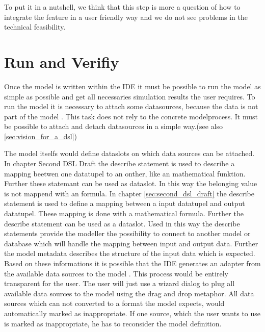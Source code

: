 To put it in a nutshell, we think that this step is more a question of how to integrate the feature in a user friendly way and we do not see problems in the technical feasibility.

\section{Run and Verifiy}
Once the model is written within the IDE it must be possible to run the model as simple as possible and get all necessaries simulation results the user requires. To run the model it is necessary to attach some datasources, because the data is not part of the model \autocite{dsl:muetzelfeldt}. This task does not rely to the concrete modelprocess. It must be possible to attach and detach datasources in a simple way.(see also \ref{sec:vision_for_a_dsl})


The model itselfs would define dataslots on which data sources can be attached. In chapter Second DSL Draft the describe statement is used to describe a mapping beetwen one datatupel to an onther, like an mathematical funktion. Further these statemant can be used as dataslot. In this way the belonging value is not mappend with an formula. In chapter \ref{sec:second_dsl_draft} the describe statement is used to define a mapping between a input datatupel and output datatupel. These mapping is done with a mathematical formula. Further the describe statement can be used as a dataslot. Used in this way the describe statements provide the modeller the possibility to connect to another model or database which will handle the mapping between input and output data. Further the model metadata describes the structure of the input data which is expected. Based on these informations it is possible that the IDE generates an adapter from the available data sources to the model \autocite[81]{Villa2009577}. This process would be entirely transparent for the user. The user will just use a wizard dialog to plug all available data sources to the model using the drag and drop metaphor. All data sources which can not converted to a format the model expects, would automatically marked as inappropriate. If one source, which the user wants to use is marked as inappropriate, he has to reconsider the model definition.


